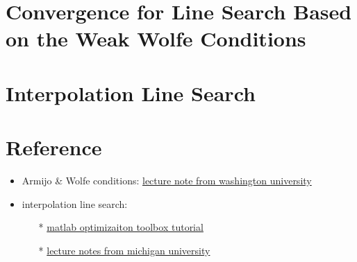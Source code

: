 \section{Convergence for Line Search Based on the Weak Wolfe Conditions}


\section{Interpolation Line Search}

\section{Reference}

\begin{itemize}
    \item Armijo \& Wolfe conditions: \href{https://sites.math.washington.edu/~burke/crs/408/notes/nlp/line.pdf}{lecture note from washington university}
    \item interpolation line search: 
    \begin{itemize} 
        \item[*] \href{http://www.ece.northwestern.edu/local-apps/matlabhelp/toolbox/optim/tutori5b.html}{matlab optimizaiton toolbox tutorial}
        \item[*] \href{https://www-personal.umich.edu/~murty/611/611slides9.pdf}{lecture notes from michigan university}
    \end{itemize}
\end{itemize}